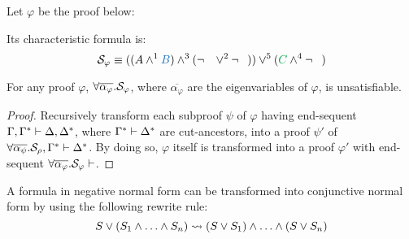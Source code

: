 \documentclass{llncs}
\begin{document}
\begin{example}
\label{example:CutPertinentStruct}

Let $\varphi$ be the proof below:
\begin{prooftree}
		 
	 
						 
					 
					 
									 
								 
\end{prooftree}

\noindent
Its characteristic formula is:
$$
\cutpertstruct{\varphi} 
\equiv 
((\hA{A} \structplus^1 \hB{B}) \structplus^3 (\structdual{\hC{B}} \structtimes^2 \structdual{\hD{A}}))
\structtimes^5
(\hE{C} \structplus^4 \structdual{\hF{C}})
$$

\end{example}

\begin{theorem}
For any proof $\varphi$, $\all \overline{\alpha_{\varphi}}. \cutpertstruct{\varphi}$, where $\overline{\alpha_{\varphi}}$ are the eigenvariables of $\varphi$, is unsatisfiable. 
\end{theorem}
\begin{proof}
Recursively transform each subproof $\psi$ of $\varphi$ having end-sequent $\Gamma, \Gamma^* \seq \Delta, \Delta^*$, where $\Gamma^* \seq \Delta^*$ are cut-ancestors, into a proof $\psi'$ of $\all \overline{\alpha_{\psi}}. \cutpertstruct{\rho}, \Gamma^* \seq \Delta^*$. By doing so, $\varphi$ itself is transformed into a proof $\varphi'$ with end-sequent $\all \overline{\alpha_{\varphi}}. \cutpertstruct{\varphi} \seq$.
\end{proof}





\label{sec:CutEliminationByResolution:CutPertinentClauseSet}




\begin{definition}
\label{definition:NormalizationPlusTimes}
A formula in negative normal form can be transformed into conjunctive normal form by using the following rewrite rule:
$$
S \structtimes (S_1 \structplus \ldots \structplus S_n)   \normalizePlusTimes  (S \structtimes S_1) \structplus \ldots \structplus (S \structtimes S_n) 
$$
\end{definition}
\end{document}
